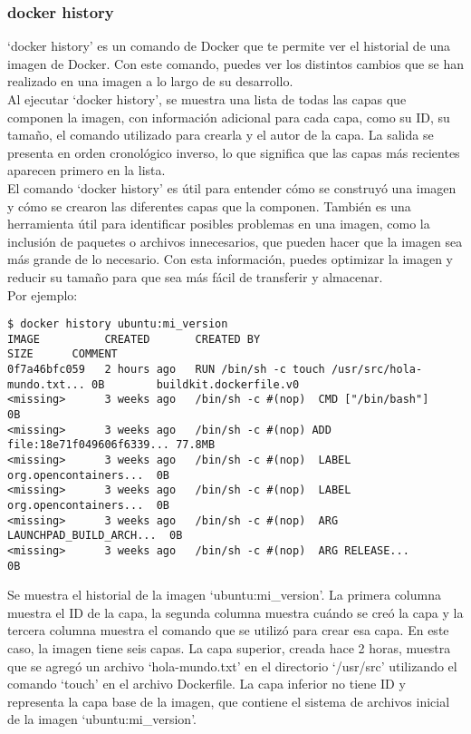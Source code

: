 \documentclass{article}
\begin{document}
\subsubsection{docker history}
\enquote*{docker history} es un comando de Docker que te permite ver el historial de una imagen de Docker. Con este comando, puedes ver los distintos cambios que se han realizado en una imagen a lo largo de su desarrollo.\\
Al ejecutar \enquote*{docker history}, se muestra una lista de todas las capas que componen la imagen, con información adicional para cada capa, como su ID, su tamaño, el comando utilizado para crearla y el autor de la capa. La salida se presenta en orden cronológico inverso, lo que significa que las capas más recientes aparecen primero en la lista.\\
El comando \enquote*{docker history} es útil para entender cómo se construyó una imagen y cómo se crearon las diferentes capas que la componen. También es una herramienta útil para identificar posibles problemas en una imagen, como la inclusión de paquetes o archivos innecesarios, que pueden hacer que la imagen sea más grande de lo necesario. Con esta información, puedes optimizar la imagen y reducir su tamaño para que sea más fácil de transferir y almacenar.\\
Por ejemplo:
\begin{lstlisting}[numbers=none]
$ docker history ubuntu:mi_version
IMAGE          CREATED       CREATED BY                                      SIZE      COMMENT
0f7a46bfc059   2 hours ago   RUN /bin/sh -c touch /usr/src/hola-mundo.txt... 0B        buildkit.dockerfile.v0
<missing>      3 weeks ago   /bin/sh -c #(nop)  CMD ["/bin/bash"]            0B        
<missing>      3 weeks ago   /bin/sh -c #(nop) ADD file:18e71f049606f6339... 77.8MB    
<missing>      3 weeks ago   /bin/sh -c #(nop)  LABEL org.opencontainers...  0B        
<missing>      3 weeks ago   /bin/sh -c #(nop)  LABEL org.opencontainers...  0B        
<missing>      3 weeks ago   /bin/sh -c #(nop)  ARG LAUNCHPAD_BUILD_ARCH...  0B        
<missing>      3 weeks ago   /bin/sh -c #(nop)  ARG RELEASE...               0B     \end{lstlisting}
Se muestra el historial de la imagen \enquote*{ubuntu:mi\_version}. La primera columna muestra el ID de la capa, la segunda columna muestra cuándo se creó la capa y la tercera columna muestra el comando que se utilizó para crear esa capa. En este caso, la imagen tiene seis capas. La capa superior, creada hace 2 horas, muestra que se agregó un archivo \enquote*{hola-mundo.txt} en el directorio \enquote*{/usr/src} utilizando el comando \enquote*{touch} en el archivo Dockerfile. La capa inferior no tiene ID y representa la capa base de la imagen, que contiene el sistema de archivos inicial de la imagen \enquote*{ubuntu:mi\_version}.
\end{document}
